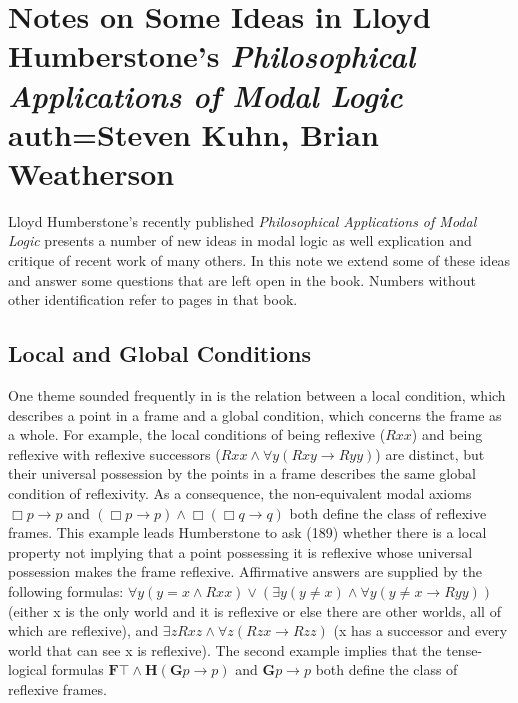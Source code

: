 \chapter[Notes on Humberstone]{Notes on Some Ideas in Lloyd Humberstone's \textit{Philosophical Applications of Modal Logic} auth=Steven Kuhn, Brian Weatherson}



Lloyd Humberstone's recently published \textit{Philosophical Applications of Modal Logic} \citep{Humberstone2016} presents a number of new ideas in modal logic as well explication and critique of recent work of many others. In this note we extend some of these ideas and answer some questions that are left open in the book. Numbers without other identification refer to pages in that book.

  \setcounter{theorem}{0}

\section{Local and Global Conditions}

One theme sounded frequently in \citet{Humberstone2016} is the relation between a local condition, which describes a point in a frame and a global condition, which concerns the frame as a whole. For example, the local conditions of being reflexive ($Rxx$) and being reflexive with reflexive successors ($Rxx \land \forall y(Rxy \rightarrow Ryy)$) are distinct, but their universal possession by the points in a frame describes the same global condition of reflexivity. As a consequence, the non-equivalent modal axioms $\Box p\rightarrow p$ and $(\Box p\rightarrow p) \land \Box(\Box q\rightarrow q)$ both define the class of reflexive frames. This example leads Humberstone to ask (189) whether there is a local property not implying that a point possessing it is reflexive whose universal possession makes the frame reflexive. Affirmative answers are supplied by the following formulas:
$\forall y(y{=}x\wedge Rxx) \vee (\exists y(y\ne x) \wedge \forall y(y\ne x \rightarrow Ryy))$ (either x is the only world and it is reflexive or else there are other worlds, all of which are reflexive), and $\exists zRxz \wedge \forall z(Rzx \rightarrow Rzz)$ (x has a successor and every world that can see x is reflexive). The second example implies that the tense-logical formulas ${\mathbf{F}}\top \wedge \mathbf{H}(\mathbf{G}p\rightarrow p)$ and $\mathbf{G}p\rightarrow p$ both define the class of reflexive frames.

